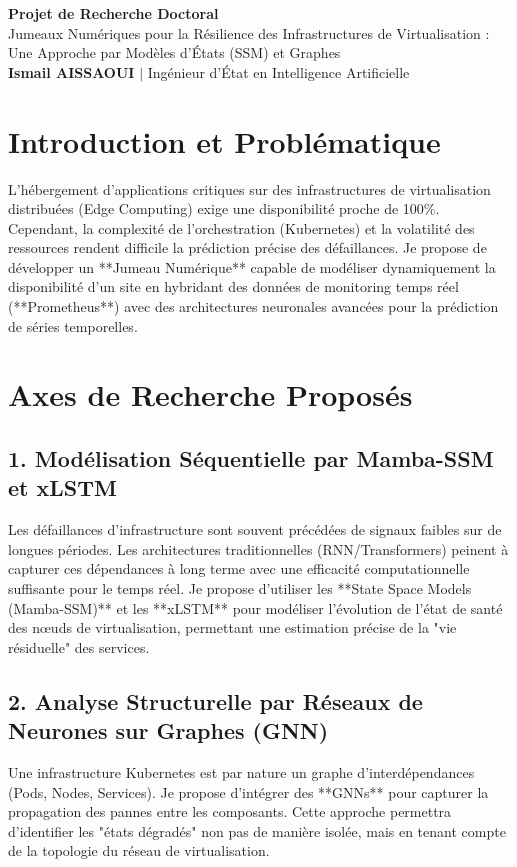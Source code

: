 \documentclass[11pt,a4paper]{article}
\begin{document}
\begin{center}
    {\LARGE\bfseries\color{orange} Projet de Recherche Doctoral}\\[6pt]
    {\large Jumeaux Numériques pour la Résilience des Infrastructures de Virtualisation : Une Approche par Modèles d'États (SSM) et Graphes}\\[4pt]
    \textbf{Ismail AISSAOUI} $|$ Ingénieur d'État en Intelligence Artificielle
\end{center}

\bigskip

\section{Introduction et Problématique}
L'hébergement d'applications critiques sur des infrastructures de virtualisation distribuées (Edge Computing) exige une disponibilité proche de 100\%. Cependant, la complexité de l'orchestration (Kubernetes) et la volatilité des ressources rendent difficile la prédiction précise des défaillances. Je propose de développer un **Jumeau Numérique** capable de modéliser dynamiquement la disponibilité d'un site en hybridant des données de monitoring temps réel (**Prometheus**) avec des architectures neuronales avancées pour la prédiction de séries temporelles.

\section{Axes de Recherche Proposés}

\subsection{1. Modélisation Séquentielle par Mamba-SSM et xLSTM}
Les défaillances d'infrastructure sont souvent précédées de signaux faibles sur de longues périodes. Les architectures traditionnelles (RNN/Transformers) peinent à capturer ces dépendances à long terme avec une efficacité computationnelle suffisante pour le temps réel. Je propose d'utiliser les **State Space Models (Mamba-SSM)** et les **xLSTM** pour modéliser l'évolution de l'état de santé des nœuds de virtualisation, permettant une estimation précise de la "vie résiduelle" des services.

\subsection{2. Analyse Structurelle par Réseaux de Neurones sur Graphes (GNN)}
Une infrastructure Kubernetes est par nature un graphe d'interdépendances (Pods, Nodes, Services). Je propose d'intégrer des **GNNs** pour capturer la propagation des pannes entre les composants. Cette approche permettra d'identifier les "états dégradés" non pas de manière isolée, mais en tenant compte de la topologie du réseau de virtualisation.
\end{document}
